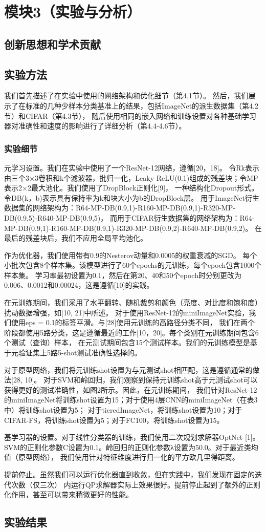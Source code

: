 \chapter{模块3（实验与分析）}

\section{创新思想和学术贡献}

\section{实验方法}
我们首先描述了在实验中使用的网络架构和优化细节（第4.1节）。
然后，我们展示了在标准的几种少样本分类基准上的结果，包括ImageNet的派生数据集（第4.2节）和CIFAR（第4.3节），
随后使用相同的嵌入网络和训练设置对各种基础学习器对准确性和速度的影响进行了详细分析（第4.4-4.6节）。
\subsection{实验细节}
元学习设置。我们在实验中使用了一个ResNet-12网络，遵循[20，18]。
令Rk表示由三个{3×3卷积和k个滤波器，批归一化，Leaky ReLU(0.1)}组成的残差块；令MP表示2×2最大池化。我们使用了DropBlock正则化[9]，
一种结构化Dropout形式。令DB(k，b)表示具有保持率为k和块大小为b的DropBlock层。
用于ImageNet衍生数据集的网络架构为：R64-MP-DB(0.9,1)-R160-MP-DB(0.9,1)-R320-MP-DB(0.9,5)-R640-MP-DB(0.9,5)，
而用于CIFAR衍生数据集的网络架构为：R64-MP-DB(0.9,1)-R160-MP-DB(0.9,1)-R320-MP-DB(0.9,2)-R640-MP-DB(0.9,2)。
在最后的残差块后，我们不应用全局平均池化。

作为优化器，我们使用带有0.9的Nesterov动量和0.0005的权重衰减的SGD。
每个小批次包含8个样本集。该模型进行了60个epochs的元训练，每个epoch包含1000个样本集。
学习率最初设置为0.1，然后在第20、40和50个epoch时分别更改为0.006、0.0012和0.00024，这是遵循[10]的实践。

在元训练期间，我们采用了水平翻转、随机裁剪和颜色（亮度、对比度和饱和度）扰动数据增强，如[10, 21]中所述。
对于使用ResNet-12的miniImageNet实验，我们使用eps = 0.1的标签平滑。与[28]使用元训练的高路径分类不同，
我们在两个阶段都使用5路分类，这是遵循最近的工作[10，20]。每个类别在元训练期间包含6个测试（查询）样本，
在元测试期间包含15个测试样本。我们的元训练模型是基于元验证集上5路5-shot测试准确性选择的。

对于原型网络，我们将元训练shot设置为与元测试shot相匹配，这是遵循通常的做法[28, 10]。
对于SVM和岭回归，我们观察到保持元训练shot高于元测试shot可以获得更好的测试准确性，如图2所示。因此，在元训练期间，
我们针对ResNet-12的miniImageNet将训练shot设置为15；对于使用4层CNN的miniImageNet（在表3中）将训练shot设置为5；
对于tieredImageNet，将训练shot设置为10；对于CIFAR-FS，将训练shot设置为5；对于FC100，将训练shot设置为15。


基学习器的设置。对于线性分类器的训练，我们使用二次规划求解器OptNet [1]。
SVM的正则化参数C设置为0.1。岭回归的正则化参数λ设置为50.0。对于最近类均值（原型网络），
我们使用针对特征维度进行归一化的平方欧几里得距离。

提前停止。虽然我们可以运行优化器直到收敛，但在实践中，我们发现在固定的迭代次数（仅三次）
内运行QP求解器实际上效果很好。提前停止起到了额外的正则化作用，甚至可以带来稍微更好的性能。

\section{实验结果}
